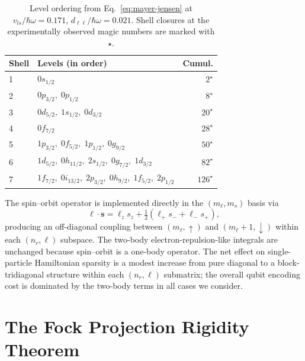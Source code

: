 \documentclass[twocolumn,prc,amsmath,amssymb,superscriptaddress]{revtex4-2}
\begin{document}
\begin{table}[t]
  \centering
  \caption{Level ordering from Eq.~\eqref{eq:mayer-jensen} at
    $v_{ls}/\hbar\omega = 0.171$, $d_{\ell\ell}/\hbar\omega = 0.021$.
    Shell closures at the experimentally observed magic numbers are
    marked with $\star$.}
  \label{tab:levels}
  \begin{ruledtabular}
  \begin{tabular}{llr}
    Shell & Levels (in order) & Cumul. \\
    \hline
    1 & $0s_{1/2}$ & $2^\star$ \\
    2 & $0p_{3/2},\;0p_{1/2}$ & $8^\star$ \\
    3 & $0d_{5/2},\;1s_{1/2},\;0d_{3/2}$ & $20^\star$ \\
    4 & $0f_{7/2}$ & $28^\star$ \\
    5 & $1p_{3/2},\;0f_{5/2},\;1p_{1/2},\;0g_{9/2}$ & $50^\star$ \\
    6 & $1d_{5/2},\;0h_{11/2},\;2s_{1/2},\;0g_{7/2},\;1d_{3/2}$ & $82^\star$ \\
    7 & $1f_{7/2},\;0i_{13/2},\;2p_{3/2},\;0h_{9/2},\;1f_{5/2},\;2p_{1/2}$
      & $126^\star$ \\
  \end{tabular}
  \end{ruledtabular}
\end{table}

The spin--orbit operator is implemented directly in the
$(m_\ell, m_s)$ basis via
\[
  \boldsymbol{\ell}\cdot\mathbf{s} = \ell_z s_z
  + \tfrac{1}{2}(\ell_+ s_- + \ell_- s_+),
\]
producing an off-diagonal coupling between $(m_\ell, {\uparrow})$ and
$(m_\ell + 1, {\downarrow})$ within each $(n_r, \ell)$ subspace. The
two-body electron-repulsion-like integrals are unchanged because
spin--orbit is a one-body operator. The net effect on single-particle
Hamiltonian sparsity is a modest increase from pure diagonal to a
block-tridiagonal structure within each $(n_r, \ell)$ submatrix; the
overall qubit encoding cost is dominated by the two-body terms in all
cases we consider.

\section{The Fock Projection Rigidity Theorem}
\label{sec:rigidity}
\end{document}
